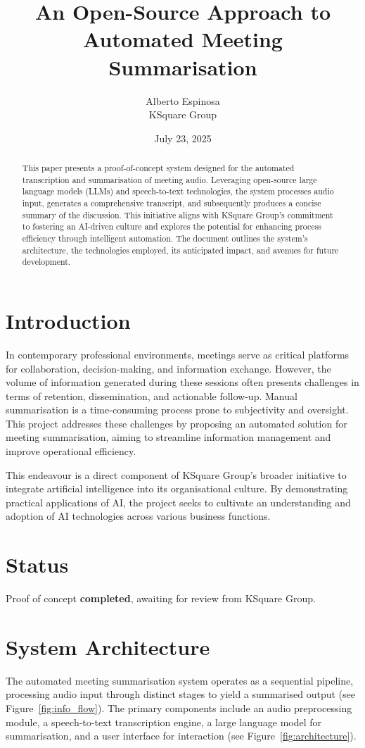 \documentclass{article}
\title{An Open-Source Approach to Automated Meeting Summarisation}
\author{Alberto Espinosa \\ KSquare Group}
\date{July 23, 2025}
\begin{document}
\maketitle

\begin{abstract}
This paper presents a proof-of-concept system designed for the automated transcription and summarisation of meeting audio. Leveraging open-source large language models (LLMs) and speech-to-text technologies, the system processes audio input, generates a comprehensive transcript, and subsequently produces a concise summary of the discussion. This initiative aligns with KSquare Group's commitment to fostering an AI-driven culture and explores the potential for enhancing process efficiency through intelligent automation. The document outlines the system's architecture, the technologies employed, its anticipated impact, and avenues for future development.
\end{abstract}

\section{Introduction}
In contemporary professional environments, meetings serve as critical platforms for collaboration, decision-making, and information exchange. However, the volume of information generated during these sessions often presents challenges in terms of retention, dissemination, and actionable follow-up. Manual summarisation is a time-consuming process prone to subjectivity and oversight. This project addresses these challenges by proposing an automated solution for meeting summarisation, aiming to streamline information management and improve operational efficiency.

This endeavour is a direct component of KSquare Group's broader initiative to integrate artificial intelligence into its organisational culture. By demonstrating practical applications of AI, the project seeks to cultivate an understanding and adoption of AI technologies across various business functions.

\section{Status}
Proof of concept \textbf{completed}, awaiting for review from KSquare Group.

\section{System Architecture}
The automated meeting summarisation system operates as a sequential pipeline, processing audio input through distinct stages to yield a summarised output (see Figure~\ref{fig:info_flow}). The primary components include an audio preprocessing module, a speech-to-text transcription engine, a large language model for summarisation, and a user interface for interaction (see Figure~\ref{fig:architecture}).
\end{document}

